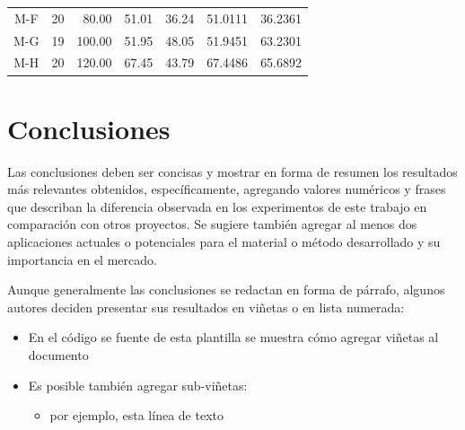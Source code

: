 \documentclass[fleqn,10pt]{SelfArx} %
\begin{document}
\begin{table}[ht]
\begin{tabular}{ccrrrrr}
        M-F         & 20                & 80.00                                                    & 51.01                                                    & 36.24                                    & 51.0111                                          & 36.2361                                          \\
        M-G         & 19                & 100.00                                                   & 51.95                                                    & 48.05                                    & 51.9451                                          & 63.2301                                          \\
        M-H         & 20                & 120.00                                                   & 67.45                                                    & 43.79                                    & 67.4486                                          & 65.6892                                         \\
        \bottomrule
    
    \end{tabular}

\label{tab:adsorcion}
\end{table}

\section{Conclusiones} %
\label{sec:conclusiones} %

Las conclusiones deben ser concisas y mostrar en forma de resumen los resultados más relevantes obtenidos, específicamente, agregando valores numéricos y frases que describan la diferencia observada en los experimentos de este trabajo en comparación con otros proyectos. Se sugiere también agregar al menos dos aplicaciones actuales o potenciales para el material o método desarrollado y su importancia en el mercado.

Aunque generalmente las conclusiones se redactan en forma de párrafo, algunos autores deciden presentar sus resultados en viñetas o en lista numerada:\vspace{1ex}

\begin{itemize}
    \item En el código se fuente de esta plantilla se muestra cómo agregar viñetas al documento
    \item Es posible también agregar sub-viñetas:
    \begin{itemize}
        \item por ejemplo, esta línea de texto
    \end{itemize}
\end{itemize}
\end{document}
